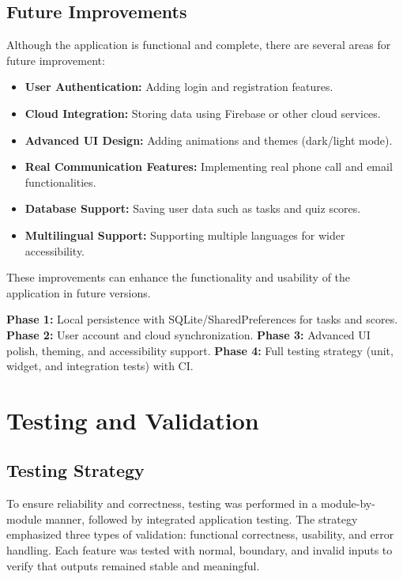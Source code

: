 \documentclass{article}
\begin{document}
\subsection{Future Improvements}

Although the application is functional and complete, there are several areas for future improvement:

\begin{itemize}
\item \textbf{User Authentication:} Adding login and registration features.
\item \textbf{Cloud Integration:} Storing data using Firebase or other cloud services.
\item \textbf{Advanced UI Design:} Adding animations and themes (dark/light mode).
\item \textbf{Real Communication Features:} Implementing real phone call and email functionalities.
\item \textbf{Database Support:} Saving user data such as tasks and quiz scores.
\item \textbf{Multilingual Support:} Supporting multiple languages for wider accessibility.
\end{itemize}

These improvements can enhance the functionality and usability of the application in future versions.
\begin{reportbox}
\textbf{Phase 1:} Local persistence with SQLite/SharedPreferences for tasks and scores.\newline
\textbf{Phase 2:} User account and cloud synchronization.\newline
\textbf{Phase 3:} Advanced UI polish, theming, and accessibility support.\newline
\textbf{Phase 4:} Full testing strategy (unit, widget, and integration tests) with CI.
\end{reportbox}

\newpage
\section{Testing and Validation}

\subsection{Testing Strategy}
To ensure reliability and correctness, testing was performed in a module-by-module manner, followed by integrated application testing. The strategy emphasized three types of validation: functional correctness, usability, and error handling. Each feature was tested with normal, boundary, and invalid inputs to verify that outputs remained stable and meaningful.
\end{document}
